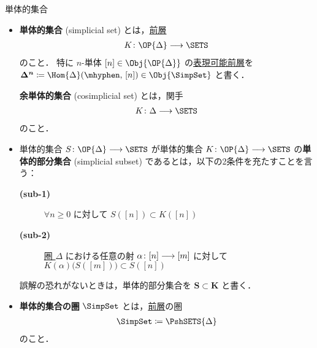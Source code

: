 \documentclass[TQFT_main]{subfiles}
\begin{document}
\begin{mydef}[label=def:SimpSet,breakable]{単体的集合}
    \begin{itemize}
        \item \textbf{単体的集合} (simplicial set)  とは，\hyperref[def:presheaf-general]{前層}
        \begin{align}
            K \colon \OP{\Delta} \lto \SETS
        \end{align}
        のこと．
        特に $n$-単体 $[n] \in \Obj{\OP{\Delta}}$ の\hyperref[def:representable]{表現可能前層}を $\bm{\Delta^n} \coloneqq \Hom{\Delta} (\mhyphen,\, [n]) \in \Obj{\SimpSet}$ と書く．

        \textbf{余単体的集合} (cosimplicial set) とは，関手
        \begin{align}
            K \colon \Delta \lto \SETS
        \end{align}
        のこと．
        \item 単体的集合 $S \colon \OP{\Delta} \lto \SETS$ が単体的集合 $K \colon \OP{\Delta} \lto \SETS$ の\textbf{単体的部分集合} (simplicial subset) であるとは，以下の2条件を充たすことを言う：
        \begin{description}
            \item[\textbf{(sub-1)}] $\forall n \ge 0$ に対して $S([n]) \subset K([n])$
            \item[\textbf{(sub-2)}] \hyperref[def:simplex-cat]{圏 $\Delta$} における任意の射 $\alpha \colon [n] \longrightarrow [m]$ に対して $K(\alpha) \bigl( S([m]) \bigr) \subset S([n])$
        \end{description}
        誤解の恐れがないときは，単体的部分集合を $\bm{S \subset K}$ と書く．
        \item \textbf{単体的集合の圏} $\SimpSet$ とは，\hyperref[def:presheaf-general]{前層}の圏
        \begin{align}
            \SimpSet \coloneqq \PshSETS{\Delta}
        \end{align}
        のこと．
    \end{itemize}

    \tcblower


\end{mydef}
\end{document}
